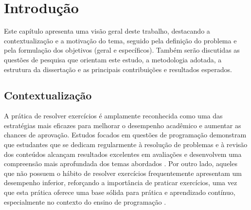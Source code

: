 \chapter{Introdução}\label{cap:modelo}

Este capítulo apresenta uma visão geral deste trabalho, destacando a contextualização e a motivação do tema, seguido pela definição do problema e pela formulação dos objetivos (geral e específicos). Também serão discutidas as questões de pesquisa que orientam este estudo, a metodologia adotada, a estrutura da dissertação e as principais contribuições e resultados esperados. 

\section{Contextualização}

A prática de resolver exercícios é amplamente reconhecida como uma das estratégias mais eficazes para melhorar o desempenho acadêmico e aumentar as chances de aprovação. Estudos focados em questões de programação demonstram que estudantes que se dedicam regularmente à resolução de problemas e à revisão dos conteúdos alcançam resultados excelentes em avaliações e desenvolvem uma compreensão mais aprofundada dos temas abordados \parencite{Ahadi2016}. Por outro lado,  aqueles que não possuem o hábito de resolver exercícios frequentemente apresentam um desempenho inferior, reforçando a importância de praticar exercícios, uma vez que esta prática oferece uma base sólida para prática e aprendizado contínuo,  especialmente no contexto do ensino de programação \parencite{Edwards2019}.  

